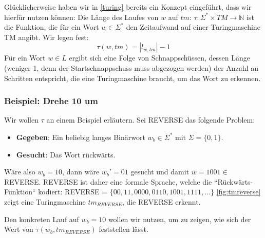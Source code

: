 Glücklicherweise haben wir in \autoref{turing} bereits ein Konzept eingeführt,
dass wir hierfür nutzen können:
Die Länge des Laufes von $w$ auf $tm$:
$\tau: \Sigma^* \times TM \rightarrow \mathbb{N}$ ist die Funktion,
die für ein Wort $w \in \Sigma^*$ den Zeitaufwand auf einer Turingmaschine TM angibt.
Wir legen fest:
\[
    \tau(w,tm) = |l_{w,tm}| - 1
\]
Für ein Wort $w \in L$ ergibt sich eine Folge von Schnappschüssen,
dessen Länge (weniger 1, denn der Startschnappschuss muss abgezogen werden)
der Anzahl an Schritten entspricht,
die eine Turingmaschine braucht,
um das Wort zu erkennen.

\subsubsection{Beispiel: Drehe 10 um}

Wir wollen $\tau$ an einem Beispiel erläutern.
Sei REVERSE das folgende Problem:
\begin{itemize}
    \item \textbf{Gegeben}: Ein beliebig langes Binärwort $w_b \in \Sigma^*$ mit $\Sigma = \{0,1\}$.
    \item \textbf{Gesucht}: Das Wort rückwärts.
\end{itemize}

Wäre also $w_b = 10$, dann wäre $w_b' = 01$ gesucht und damit $w = 1001 \in$ REVERSE.
REVERSE ist daher eine formale Sprache,
welche die ``Rückwärts-Funktion`` kodiert:
REVERSE = $\{00, 11, 0000, 0110, 1001, 1111, \ldots\}$
\autoref{fig:tmreverse} zeigt eine Turingmaschine $tm_{REVERSE}$, die REVERSE erkennt.

Den konkreten Lauf auf $w_b = 10$ wollen wir nutzen,
um zu zeigen, wie sich der Wert von $\tau(w_b, tm_{REVERSE})$ feststellen lässt.

\newpage

